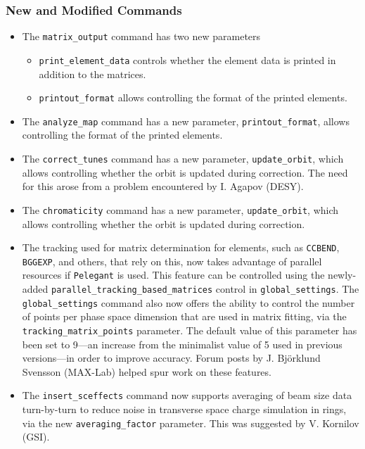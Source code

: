 \documentclass[11pt]{article}
\begin{document}
\subsubsection{New and Modified Commands}
\begin{itemize}
\item The \verb|matrix_output| command has two new parameters
  \begin{itemize}
    \item \verb|print_element_data| controls whether the element data is printed in addition to the matrices. 
    \item \verb|printout_format| allows controlling the format of the printed elements.
    \end{itemize}
\item The \verb|analyze_map| command has a new parameter, \verb|printout_format|, allows controlling the format of the printed elements.
\item The \verb|correct_tunes| command has a new parameter, \verb|update_orbit|, which allows controlling whether the orbit
  is updated during correction. The need for this arose from a problem encountered by I. Agapov (DESY).
\item The \verb|chromaticity| command has a new parameter, \verb|update_orbit|, which allows controlling whether the orbit
  is updated during correction.
\item The tracking used for matrix determination for elements, such as \verb|CCBEND|, \verb|BGGEXP|, and others, that rely on this,
  now takes advantage of parallel resources if \verb|Pelegant| is used. This feature can be controlled using the newly-added
  \verb|parallel_tracking_based_matrices| control in \verb|global_settings|. The \verb|global_settings| command also
  now offers the ability to control the number of points per phase space dimension that are used in matrix fitting, 
  via the \verb|tracking_matrix_points| parameter. The default value of this parameter has been set to 9---an increase from
  the minimalist value of 5 used in previous versions---in order to improve accuracy. Forum posts
  by J. Bj{\"o}rklund Svensson (MAX-Lab) helped spur work on these features.
\item The \verb|insert_sceffects| command now supports averaging of beam size data turn-by-turn to reduce noise in 
  transverse space charge simulation in rings, via the new \verb|averaging_factor| parameter.  This was suggested by 
  V. Kornilov (GSI).
\end{itemize}
\end{document}
